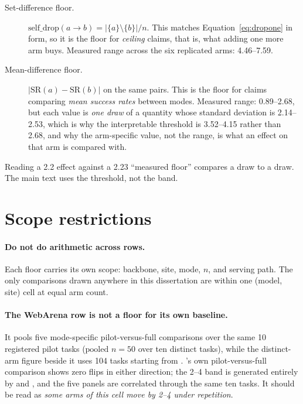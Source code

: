 \begin{description}
\item[Set-difference floor.]
  $\mathrm{self\_drop}(a\!\to\!b)=|\{a\}\setminus\{b\}|/n$. This matches
  Equation~\ref{eq:dropone} in form, so it is the floor for \emph{ceiling} claims, that is, what adding one more arm buys. Measured range across the six
  replicated  arms: 4.46--7.59\pp.
\item[Mean-difference floor.] $|\mathrm{SR}(a)-\mathrm{SR}(b)|$ on the same
  pairs. This is the floor for claims comparing \emph{mean success rates}
  between modes. Measured range: 0.89--2.68\pp, but each value is \emph{one draw} of a quantity whose standard deviation is 2.14--2.53\pp, which
  is why the interpretable threshold is 3.52--4.15\pp{} rather than 2.68\pp,
  and why the arm-specific value, not the range, is what an effect on that arm
  is compared with.
\end{description}

Reading a 2.2\pp{} effect against a 2.23\pp{} ``measured floor'' compares a draw
to a draw. The main text uses the threshold, not the band.

\section{Scope restrictions}

\paragraph{Do not do arithmetic across rows.} Each floor carries its own scope: backbone, site, mode, $n$, and serving path. The only comparisons drawn
anywhere in this dissertation are within one (model, site) cell at equal arm
count.

\paragraph{The WebArena row is not a floor for its own baseline.} It pools five
mode-specific pilot-versus-full comparisons over the same 10 registered pilot
tasks ($\text{pooled }n=50$ over ten distinct tasks), while the distinct-arm
figure beside it uses 104 tasks starting from \mDOM{}. \mDOM{}'s own
pilot-versus-full comparison shows zero flips in either direction; the 2--4\pp{}
band is generated entirely by \mVis{} and \mPP{}, and the five panels are
correlated through the same ten tasks. It should be read as \emph{some arms of
this cell move by 2--4\pp{} under repetition}.

